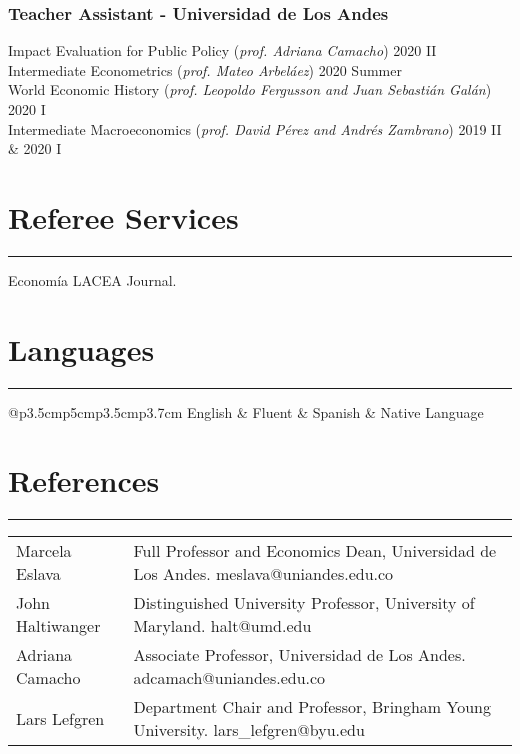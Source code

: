 \documentclass[12pt, letterpaper]{article}
\begin{document}
\subsubsection*{Teacher Assistant - Universidad de Los Andes}
\vspace*{-1mm}
\noindent
Impact Evaluation for Public Policy  \hspace{5mm} (\textit{prof. Adriana Camacho}) \hfill 2020 II \\
Intermediate Econometrics  \hspace{5mm} (\textit{prof. Mateo Arbeláez}) \hfill 2020 Summer \\
World Economic History  \hspace{5mm} (\small{\textit{prof. Leopoldo Fergusson and Juan Sebastián Galán}})  \hfill  2020 I  \\
Intermediate Macroeconomics \hspace{5mm}  (\textit{prof. David Pérez and Andrés Zambrano}) \hfill 2019 II \& 2020 I \\

\vspace*{-5mm}

\section*{Referee Services}
\vspace*{-8mm}
\noindent \rule{\linewidth}{0.2mm}
\noindent Economía LACEA Journal.

\vspace{-4mm}

\section*{Languages}
\vspace*{-8mm}
\noindent \rule{\linewidth}{0.2mm}
\noindent
\begin{tabular}{@{}p{3.5cm}p{5cm}p{3.5cm}p{3.7cm}}
English & Fluent	&  Spanish & Native Language \\
\end{tabular}

\vspace{-4mm}

\section*{References}
\vspace*{-8mm}
\noindent \rule{\linewidth}{0.2mm}
\noindent
\begin{tabular}{@{}p{3.5cm}p{13.7cm}}
\\ [-3mm]
Marcela Eslava & Full Professor and Economics Dean, Universidad de Los Andes. meslava@uniandes.edu.co \\ [8mm]
John Haltiwanger & Distinguished University Professor, University of Maryland. halt@umd.edu \\ [4mm]
Adriana Camacho	& Associate Professor, Universidad de Los Andes. adcamach@uniandes.edu.co
\\ [4mm]
Lars Lefgren & Department Chair and Professor, Bringham Young University. lars\_lefgren@byu.edu
\end{tabular}
\end{document}
